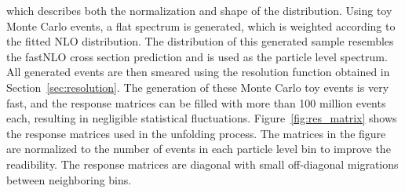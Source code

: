 which describes both the normalization and shape of the distribution. Using toy
Monte Carlo events, a flat \ptavg spectrum is generated, which is weighted
according to the fitted NLO distribution. The distribution of this generated
sample resembles the fastNLO cross section prediction and is used as the
particle level \ptavg spectrum. All generated events are then smeared using the
resolution function obtained in Section~\ref{sec:resolution}. The generation of
these Monte Carlo toy events is very fast, and the response matrices can be
filled with more than 100 million events each, resulting in negligible statistical
fluctuations. Figure~\ref{fig:res_matrix} shows the response matrices used in
the unfolding process. The matrices in the figure are normalized to the number
of events in each particle level bin to improve the readibility. The response
matrices are diagonal with small off-diagonal migrations between neighboring
\ptavg bins.

